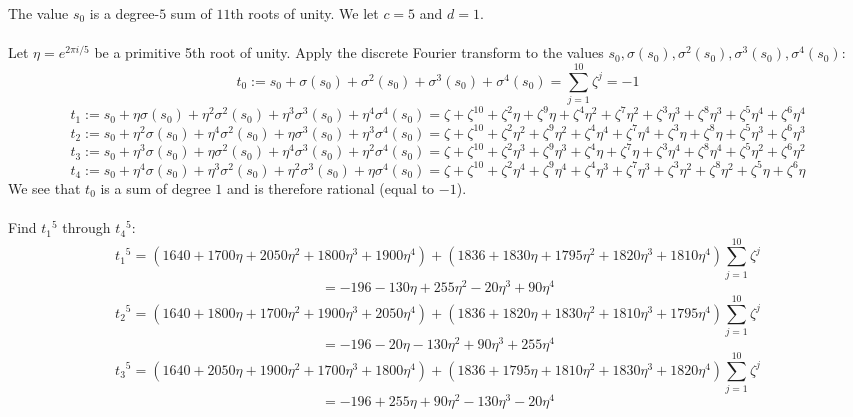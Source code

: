 \documentclass{article}
\begin{document}
        \begin{adjustwidth}{1cm}{}
            The value $ s_0 $ is a degree-$ 5 $ sum of $ 11 $th roots of unity. We let $ c = 5 $ and $ d = 1 $.\\
            \\
            Let $ \eta = e^{2\pi i/5} $ be a primitive 5th root of unity. Apply the discrete Fourier transform to the values $ s_0, \sigma(s_0), \sigma^2(s_0), \sigma^3(s_0), \sigma^4(s_0) $:
            $$ t_0 := s_0 + \sigma(s_0) + \sigma^2(s_0) + \sigma^3(s_0) + \sigma^4(s_0) = \sum_{j = 1}^{10} \zeta^j = -1 $$
            $$ t_1 := s_0 + \eta \sigma(s_0) + \eta^2 \sigma^2(s_0) + \eta^3 \sigma^3(s_0) + \eta^4 \sigma^4(s_0) = \zeta + \zeta^{10} + \zeta^2 \eta + \zeta^9 \eta + \zeta^4 \eta^2 + \zeta^7 \eta^2 + \zeta^3 \eta^3 + \zeta^8 \eta^3 + \zeta^5 \eta^4 + \zeta^6 \eta^4 $$
            $$ t_2 := s_0 + \eta^2 \sigma(s_0) + \eta^4 \sigma^2(s_0) + \eta \sigma^3(s_0) + \eta^3 \sigma^4(s_0) = \zeta + \zeta^{10} + \zeta^2 \eta^2 + \zeta^9 \eta^2 + \zeta^4 \eta^4 + \zeta^7 \eta^4 + \zeta^3 \eta + \zeta^8 \eta + \zeta^5 \eta^3 + \zeta^6 \eta^3 $$
            $$ t_3 := s_0 + \eta^3 \sigma(s_0) + \eta \sigma^2(s_0) + \eta^4 \sigma^3(s_0) + \eta^2 \sigma^4(s_0) = \zeta + \zeta^{10} + \zeta^2 \eta^3 + \zeta^9 \eta^3 + \zeta^4 \eta + \zeta^7 \eta + \zeta^3 \eta^4 + \zeta^8 \eta^4 + \zeta^5 \eta^2 + \zeta^6 \eta^2 $$
            $$ t_4 := s_0 + \eta^4 \sigma(s_0) + \eta^3 \sigma^2(s_0) + \eta^2 \sigma^3(s_0) + \eta \sigma^4(s_0) = \zeta + \zeta^{10} + \zeta^2 \eta^4 + \zeta^9 \eta^4 + \zeta^4 \eta^3 + \zeta^7 \eta^3 + \zeta^3 \eta^2 + \zeta^8 \eta^2 + \zeta^5 \eta + \zeta^6 \eta $$
            We see that $ t_0 $ is a sum of degree $ 1 $ and is therefore rational (equal to $ -1 $).\\
            \\
            Find $ {t_1}^5 $ through $ {t_4}^5 $:
            $$ {t_1}^5 = (1640 + 1700\eta + 2050\eta^2 + 1800\eta^3 + 1900\eta^4) + (1836 + 1830\eta + 1795\eta^2 + 1820\eta^3 + 1810\eta^4) \sum_{j = 1}^{10} \zeta^j $$
            $$ = -196 - 130 \eta + 255 \eta^2 - 20 \eta^3 + 90 \eta^4 $$
            $$ {t_2}^5 = (1640 + 1800\eta + 1700\eta^2 + 1900\eta^3 + 2050\eta^4) + (1836 + 1820\eta + 1830\eta^2 + 1810\eta^3 + 1795\eta^4) \sum_{j = 1}^{10} \zeta^j $$
            $$ = -196 - 20 \eta - 130 \eta^2 + 90 \eta^3 + 255 \eta^4 $$
            $$ {t_3}^5 = (1640 + 2050\eta + 1900\eta^2 + 1700\eta^3 + 1800\eta^4) + (1836 + 1795\eta + 1810\eta^2 + 1830\eta^3 + 1820\eta^4) \sum_{j = 1}^{10} \zeta^j $$
            $$ = -196 + 255 \eta + 90 \eta^2 - 130 \eta^3 - 20 \eta^4 $$

\end{adjustwidth}
\end{document}
